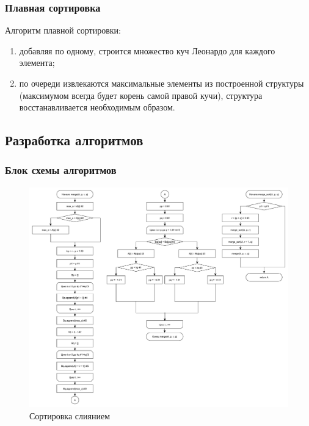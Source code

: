 \documentclass[12pt,a4paper]{scrartcl}
\begin{document}
	\subsubsection{Плавная сортировка}

		Алгоритм плавной сортировки:
		\begin{enumerate}
			\item добавляя по одному, строится множество куч Леонардо для каждого элемента;
			\item по очереди извлекаются максимальные элементы из построенной структуры (максимумом всегда будет корень самой правой кучи), структура восстанавливается необходимым образом.
		\end{enumerate}
		\cite{SmD}

	\subsection{Разработка алгоритмов}
	
	\subsubsection{Блок схемы алгоритмов}

		\begin{figure}[H]
			\centering
			\includegraphics[width=\linewidth]{merge.pdf}
			\caption{Сортировка слиянием}
			\label{graph2.1}
		\end{figure}
\end{document}
